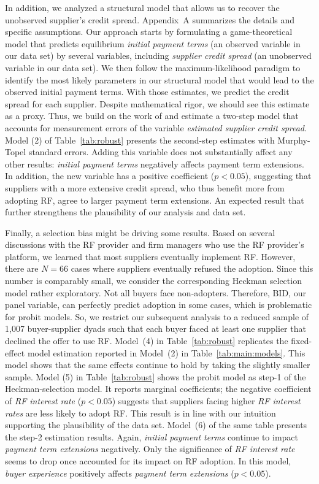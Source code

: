 \documentclass[A4,11pt]{article}
\renewcommand{\~}[1]{\tilde{#1}}
\renewcommand{\-}[1]{\overline{#1}}
\begin{document}
In addition, we analyzed a structural model that allows us to recover the unobserved supplier's credit spread. Appendix~A summarizes the details and specific assumptions. Our approach starts by formulating a game-theoretical model that predicts equilibrium \textit{initial payment terms} (an observed variable in our data set) by several variables, including \textit{supplier credit spread} (an unobserved variable in our data set). We then follow the maximum-likelihood paradigm to identify the most likely parameters in our structural model that would lead to the observed initial payment terms. With those estimates, we predict the credit spread for each supplier. Despite mathematical rigor, we should see this estimate as a proxy. Thus, we build on the work of \citet{murphy2002estimation} and estimate a two-step model that accounts for measurement errors of the variable \textit{estimated supplier credit spread}. Model (2) of Table~\ref{tab:robust} presents the second-step estimates with Murphy-Topel standard errors. Adding this variable does not substantially affect any other results: \textit{initial payment terms} negatively affects payment term extensions. In addition, the new variable has a positive coefficient ($p<0.05$), suggesting that suppliers with a more extensive credit spread, who thus benefit more from adopting RF, agree to larger payment term extensions. An expected result that further strengthens the plausibility of our analysis and data set.



\FloatBarrier
Finally, a selection bias might be driving some results. Based on several discussions with the RF provider and firm managers who use the RF provider's platform, we learned that most suppliers eventually implement RF. However, there are $N=66$ cases where suppliers eventually refused the adoption. Since this number is comparably small, we consider the corresponding Heckman selection model rather exploratory. Not all buyers face non-adopters. Therefore, BID, our panel variable, can perfectly predict adoption in some cases, which is problematic for probit models. So, we restrict our subsequent analysis to a reduced sample of 1,007 buyer-supplier dyads such that each buyer faced at least one supplier that declined the offer to use RF. Model~(4) in Table~\ref{tab:robust} replicates the fixed-effect model estimation reported in Model~(2) in Table~\ref{tab:main:models}. This model shows that the same effects continue to hold by taking the slightly smaller sample. Model (5) in Table~\ref{tab:robust} shows the probit model as step-1 of the Heckman-selection model. It reports marginal coefficients; the negative coefficient of \textit{RF interest rate} ($p<0.05$) suggests that suppliers facing higher \textit{RF interest rates} are less likely to adopt RF. This result is in line with our intuition supporting the plausibility of the data set. Model~(6) of the same table presents the step-2 estimation results. Again, \textit{initial payment terms} continue to impact \textit{payment term extensions} negatively. Only the significance of \textit{RF interest rate} seems to drop once accounted for its impact on RF adoption. In this model, \textit{buyer experience} positively affects \textit{payment term extensions} ($p<0.05$).
\end{document}
